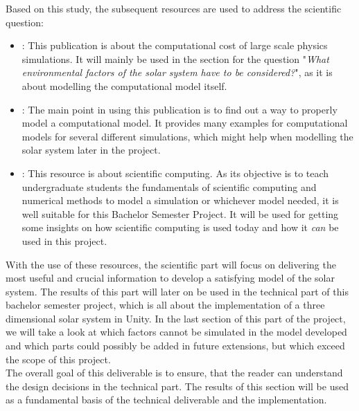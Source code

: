 \documentclass[conference,compsoc]{IEEEtran}
\begin{document}
Based on this study, the subsequent resources are used to address the scientific question:
\begin{itemize}
	\item \cite{PhysicsSimulationsLargeWorlds}: This publication is about the computational cost of large scale physics simulations. It will mainly be used in the section for the question "\emph{What environmental factors of the solar system have to be considered?}", as it is about modelling the computational model itself. 
	\item \cite{ComputationalModelling}: The main point in using this publication is to find out a way to properly model a computational model. It provides many examples for computational models for several different simulations, which might help when modelling the solar system later in the project.
	\item \cite{ScientificComputing}: This resource is about scientific computing. As its objective is to teach undergraduate students the fundamentals of scientific computing and numerical methods to model a simulation or whichever model needed, it is well suitable for this Bachelor Semester Project. It will be used for getting some insights on how scientific computing is used today and how it \emph{can} be used in this project.
\end{itemize}
With the use of these resources, the scientific part will focus on delivering the most useful and crucial information to develop a satisfying model of the solar system. The results of this part will later on be used in the technical part of this bachelor semester project, which is all about the implementation of a three dimensional solar system in Unity. In the last section of this part of the project, we will take a look at which factors cannot be simulated in the model developed and which parts could possibly be added in future extensions, but which exceed the scope of this project. \\
The overall goal of this deliverable is to ensure, that the reader can understand the design decisions in the technical part. The results of this section will be used as a fundamental basis of the technical deliverable and the implementation.
\end{document}
